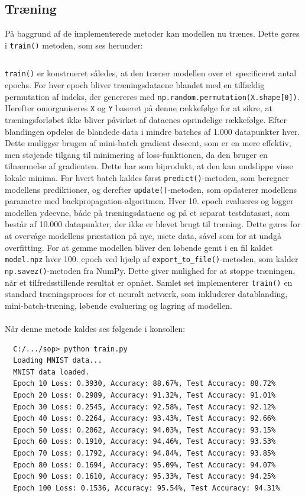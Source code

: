 \documentclass{article}
\begin{document}
\subsection{Træning}
På baggrund af de implementerede metoder kan modellen nu trænes. Dette gøres i \texttt{train()} metoden, som ses herunder:
\inputminted[firstline=61, lastline=78]{python}{train.py}\noindent
\texttt{train()} er konstrueret således, at den træner modellen over et specificeret antal epochs. For hver epoch bliver træningsdataene blandet med en tilfældig permutation af indeks, der genereres med \texttt{np.random.permutation(X.shape[0])}. Herefter omorganiseres \texttt{X} og \texttt{Y} baseret på denne rækkefølge for at sikre, at træningsforløbet ikke bliver påvirket af dataenes oprindelige rækkefølge. Efter blandingen opdeles de blandede data i mindre batches af 1.000 datapunkter hver. Dette muliggør brugen af mini-batch gradient descent, som er en mere effektiv, men støjende tilgang til minimering af loss-funktionen, da den bruger en tilnærmelse af gradienten. Dette har som biprodukt, at den kan undslippe visse lokale minima. For hvert batch kaldes først \texttt{predict()}-metoden, som beregner modellens prediktioner, og derefter \texttt{update()}-metoden, som opdaterer modellens parametre med backpropagation-algoritmen. Hver 10. epoch evalueres og logger modellen ydeevne, både på træningsdataene og på et separat testdatasæt, som består af 10.000 datapunkter, der ikke er blevet brugt til træning. Dette gøres for at overvåge modellens præstation på nye, usete data, såvel som for at undgå overfitting. For at gemme modellen bliver den løbende gemt i en fil kaldet \texttt{model.npz} hver 100. epoch ved hjælp af \texttt{export\_to\_file()}-metoden, som kalder \texttt{np.savez()}-metoden fra NumPy. Dette giver mulighed for at stoppe træningen, når et tilfredsstillende resultat er opnået. Samlet set implementerer \texttt{train()} en standard træningsproces for et neuralt netværk, som inkluderer datablanding, mini-batch-træning, løbende evaluering og lagring af modellen.\\\\
Når denne metode kaldes ses følgende i konsollen:
\begin{verbatim}
  C:/.../sop> python train.py
  Loading MNIST data...
  MNIST data loaded.
  Epoch 10 Loss: 0.3930, Accuracy: 88.67%, Test Accuracy: 88.72%
  Epoch 20 Loss: 0.2989, Accuracy: 91.32%, Test Accuracy: 91.01%
  Epoch 30 Loss: 0.2545, Accuracy: 92.58%, Test Accuracy: 92.12%
  Epoch 40 Loss: 0.2264, Accuracy: 93.43%, Test Accuracy: 92.66%
  Epoch 50 Loss: 0.2062, Accuracy: 94.03%, Test Accuracy: 93.15%
  Epoch 60 Loss: 0.1910, Accuracy: 94.46%, Test Accuracy: 93.53%
  Epoch 70 Loss: 0.1792, Accuracy: 94.84%, Test Accuracy: 93.85%
  Epoch 80 Loss: 0.1694, Accuracy: 95.09%, Test Accuracy: 94.07%
  Epoch 90 Loss: 0.1610, Accuracy: 95.33%, Test Accuracy: 94.25%
  Epoch 100 Loss: 0.1536, Accuracy: 95.54%, Test Accuracy: 94.31%
\end{verbatim}
\end{document}
